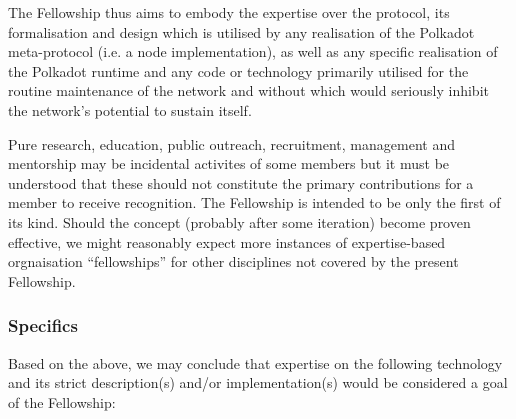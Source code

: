 \documentclass[9pt,oneside]{amsart}
\makeatletter
\newcommand*\ie{i.e.\@\xspace}
\makeatother
\begin{document}
The Fellowship thus aims to embody the expertise over the protocol, its formalisation and design which is utilised by any realisation of the Polkadot meta-protocol (\ie a node implementation), as well as any specific realisation of the Polkadot runtime and any code or technology primarily utilised for the routine maintenance of the network and without which would seriously inhibit the network's potential to sustain itself.

Pure research, education, public outreach, recruitment, management and mentorship may be incidental activites of some members but it must be understood that these should not constitute the primary contributions for a member to receive recognition. The Fellowship is intended to be only the first of its kind. Should the concept (probably after some iteration) become proven effective, we might reasonably expect more instances of expertise-based orgnaisation ``fellowships'' for other disciplines not covered by the present Fellowship.

\subsubsection{Specifics}

Based on the above, we may conclude that expertise on the following technology and its strict description(s) and/or implementation(s) would be considered a goal of the Fellowship:
\end{document}
